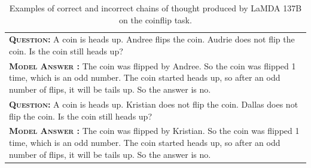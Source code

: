 \documentclass[]{article}
\newcommand{\xmark}{\ding{55}}%
\theoremstyle{plain}
\theoremstyle{definition}
\theoremstyle{remark}
\newcommand{\lamda}[0]{LaMDA}
\begin{document}
\begin{table}[H]
    \caption{
    Examples of correct and incorrect chains of thought produced by \lamda{} 137B on the coinflip task.
    }
    \centering
    \small
    \begin{tabular}{p{\linewidth}}
        \toprule
        \vspace{-2mm}
        \textbf{\textsc{Question:}} A coin is heads up. Andree flips the coin. Audrie does not flip the coin. Is the coin still heads up?  \\
        \vspace{-1mm}
        \textbf{\textsc{Model Answer \color{darkGreen}{(CORRECT)}:}} The coin was flipped by Andree. So the coin was flipped 1 time, which is an odd number. The coin started heads up, so after an odd number of flips, it will be tails up. So the answer is no. \color{darkGreen}{\checkmark} \\
        \midrule
        \vspace{-2mm}
        \textbf{\textsc{Question:}} A coin is heads up. Kristian does not flip the coin. Dallas does not flip the coin. Is the coin still heads up? \\
        \vspace{-1mm}
        \textbf{\textsc{Model Answer \color{blue}{(INCORRECT)}:}} The coin {\color{blue} was flipped by Kristian}. So the coin was flipped 1 time, which is an odd number. The coin started heads up, so after an odd number of flips, it will be tails up. So the answer is no. \color{blue}{\xmark} \\
        \bottomrule
    \end{tabular}
    \label{tab:appendix-coinflip-examples}
\end{table}
\endgroup
{}
\begingroup
\end{document}
